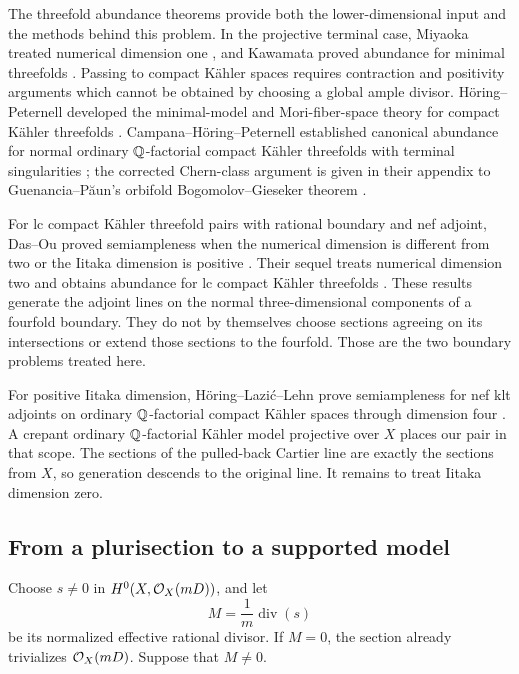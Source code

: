 The threefold abundance theorems provide both the lower-dimensional
input and the methods behind this problem.  In the projective terminal
case, Miyaoka treated numerical dimension one
\cite{Miyaoka1988}, and Kawamata proved abundance for minimal
threefolds \cite{Kawamata1992}.  Passing to compact K\"ahler spaces
requires contraction and positivity arguments which cannot be obtained
by choosing a global ample divisor.  H\"oring--Peternell developed the
minimal-model and Mori-fiber-space theory for compact K\"ahler
threefolds \cite{HoeringPeternell2016,HoeringPeternell2015}.
Campana--H\"oring--Peternell established canonical abundance for normal
ordinary \(\mathbb Q\)-factorial compact K\"ahler threefolds with terminal
singularities \cite{CampanaHoeringPeternell2016}; the corrected
Chern-class argument is given in their appendix to
Guenancia--P\u{a}un's orbifold Bogomolov--Gieseker theorem
\cite[Appendix, Theorem~A.2]{GuenanciaPaun2025}.

For lc compact K\"ahler threefold pairs with rational boundary and nef
adjoint, Das--Ou proved semiampleness when the numerical dimension is
different from two or the Iitaka dimension is positive
\cite[Theorem~1.1]{DasOu2022}.  Their sequel treats numerical dimension
two and obtains abundance for lc compact K\"ahler threefolds
\cite[Theorem~1.2 and Corollary~1.3]{DasOu2025}.
These results generate the adjoint lines on the normal three-dimensional
components of a fourfold boundary.  They do not by themselves choose
sections agreeing on its intersections or extend those sections to the
fourfold.  Those are the two boundary problems treated here.

For positive Iitaka dimension, H\"oring--Lazi\'c--Lehn prove
semiampleness for nef klt adjoints on ordinary \(\mathbb Q\)-factorial compact
K\"ahler spaces through dimension four
\cite[Theorem~4.1]{HoeringLazicLehn2025}.  A crepant ordinary
\(\mathbb Q\)-factorial K\"ahler model projective over \(X\) places our pair
in that scope.  The sections of the pulled-back Cartier line are exactly
the sections from \(X\), so generation descends to the original line.
It remains to treat Iitaka dimension zero.

\subsection*{From a plurisection to a supported model}

Choose \(s\ne0\) in \(H^0(X,\mathcal O_X(mD))\), and let
\[
 M=\frac1m\operatorname{div}(s)
\]
be its normalized effective rational divisor.  If \(M=0\), the section
already trivializes \(\mathcal O_X(mD)\).  Suppose that \(M\ne0\).

